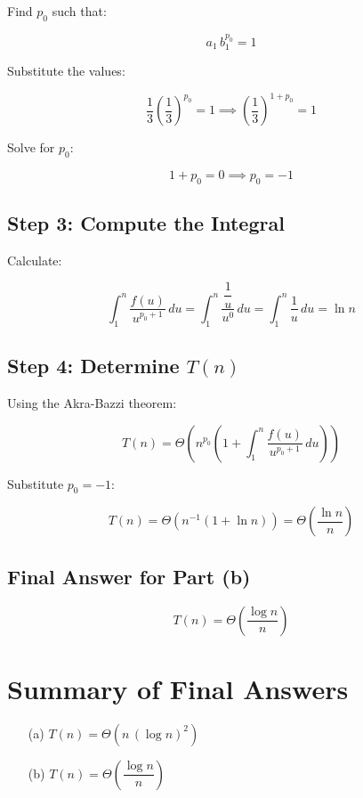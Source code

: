 \documentclass[10pt,letter,notitlepage]{article}
\begin{document}
\begin{Answer}
Find \( p_0 \) such that:

\[
a_1\, b_1^{p_0} = 1
\]

Substitute the values:

\[
\dfrac{1}{3} \left( \dfrac{1}{3} \right)^{p_0} = 1 \implies \left( \dfrac{1}{3} \right)^{1 + p_0} = 1
\]

Solve for \( p_0 \):

\[
1 + p_0 = 0 \implies p_0 = -1
\]

\subsection*{Step 3: Compute the Integral}

Calculate:

\[
\int_{1}^{n} \dfrac{f(u)}{u^{p_0 + 1}}\, du = \int_{1}^{n} \dfrac{\dfrac{1}{u}}{u^{0}}\, du = \int_{1}^{n} \dfrac{1}{u}\, du = \ln n
\]

\subsection*{Step 4: Determine \( T(n) \)}

Using the Akra-Bazzi theorem:

\[
T(n) = \Theta\left( n^{p_0} \left( 1 + \int_{1}^{n} \dfrac{f(u)}{u^{p_0 + 1}}\, du \right) \right)
\]

Substitute \( p_0 = -1 \):

\[
T(n) = \Theta\left( n^{-1} \left( 1 + \ln n \right) \right) = \Theta\left( \dfrac{\ln n}{n} \right)
\]

\subsection*{Final Answer for Part (b)}

\[
T(n) = \Theta\left( \dfrac{\log n}{n} \right)
\]

\bigskip

\section*{Summary of Final Answers}

\begin{enumerate}
    \item[(a)] \( T(n) = \Theta\left( n\, (\log n)^2 \right) \)
    \item[(b)] \( T(n) = \Theta\left( \dfrac{\log n}{n} \right) \)
\end{enumerate}

\end{Answer}
\end{document}
